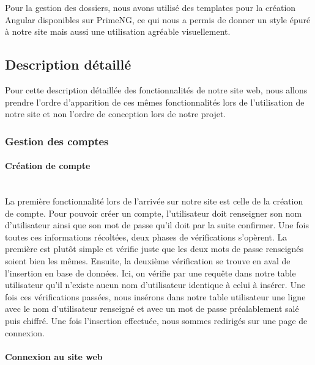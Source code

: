 \documentclass[12pt,french]{article}
\begin{document}
Pour la gestion des dossiers, nous avons utilisé des templates pour la création Angular disponibles sur PrimeNG, ce qui nous a permis de donner un style épuré à notre site mais aussi une utilisation agréable visuellement.

\subsection{Description détaillé} 

Pour cette description détaillée des fonctionnalités de notre site web, nous allons prendre l'ordre d'apparition de ces mêmes fonctionnalités lors de l'utilisation de notre site et non l'ordre de conception lors de notre projet.
\subsubsection{Gestion des comptes}

\paragraph{Création de compte \\\\}

La première fonctionnalité lors de l'arrivée sur notre site est celle de la création de compte. Pour pouvoir créer un compte, l'utilisateur doit renseigner son nom d'utilisateur ainsi que son mot de passe qu'il doit par la suite confirmer. Une fois toutes ces informations récoltées, deux phases de vérifications s'opèrent. La première est plutôt simple et vérifie juste que les deux mots de passe renseignés soient bien les mêmes. Ensuite, la deuxième vérification se trouve en aval de l'insertion en base de données. Ici, on vérifie par une requête dans notre table utilisateur qu'il n'existe aucun nom d'utilisateur identique à celui à insérer. Une fois ces vérifications passées, nous insérons dans notre table utilisateur une ligne avec le nom d'utilisateur renseigné et avec un mot de passe préalablement \gls{salé} puis \gls{chiffré}. Une fois l'insertion effectuée, nous sommes redirigés sur une page de connexion.


\paragraph{Connexion au site web \\\\}
\end{document}
